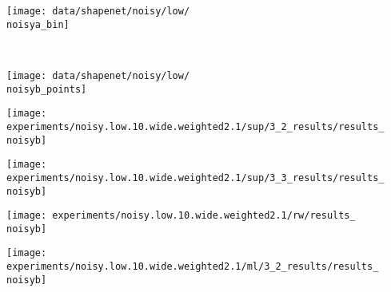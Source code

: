\begin{minipage}[t]{0.1\textwidth}
    \vspace{0px}\centering
    \texttt{[image: data/shapenet/noisy/low/\\noisya\_bin]}
\end{minipage}
\\
\begin{minipage}[t]{0.02\textwidth}
    \vspace{0px}\centering
\end{minipage}
\begin{minipage}[t]{0.1\textwidth}
    \vspace{0px}\centering
    \texttt{[image: data/shapenet/noisy/low/\\noisyb\_points]}
\end{minipage}
\begin{minipage}[t]{0.1\textwidth}
    \vspace{0px}\centering
    \texttt{[image: experiments/noisy.low.10.wide.weighted2.1/sup/3\_2\_results/results\_\\noisyb]}
\end{minipage}
\begin{minipage}[t]{0.1\textwidth}
    \vspace{0px}\centering
    \texttt{[image: experiments/noisy.low.10.wide.weighted2.1/sup/3\_3\_results/results\_\\noisyb]}
\end{minipage}
\begin{minipage}[t]{0.1\textwidth}
    \vspace{0px}\centering
    \texttt{[image: experiments/noisy.low.10.wide.weighted2.1/rw/results\_\\noisyb]}
\end{minipage}
\begin{minipage}[t]{0.1\textwidth}
    \vspace{0px}\centering
    \texttt{[image: experiments/noisy.low.10.wide.weighted2.1/ml/3\_2\_results/results\_\\noisyb]}
\end{minipage}
